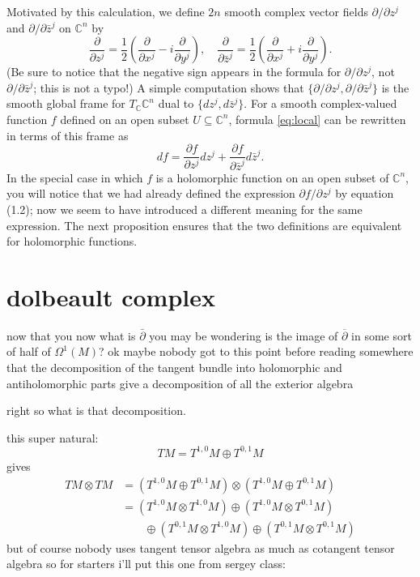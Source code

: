 Motivated by this calculation, we define $2n$ smooth complex vector fields $\partial/\partial z^j$ and $\partial/\partial \bar{z}^j$ on $\mathbb{C}^n$ by
\begin{equation*}
\frac{\partial}{\partial z^j} = \frac{1}{2}\left(\frac{\partial}{\partial x^j} - i\frac{\partial}{\partial y^j}\right), \quad
\frac{\partial}{\partial \bar{z}^j} = \frac{1}{2}\left(\frac{\partial}{\partial x^j} + i\frac{\partial}{\partial y^j}\right).
\end{equation*}
(Be sure to notice that the negative sign appears in the formula for $\partial/\partial z^j$, not $\partial/\partial \bar{z}^j$; this is not a typo!) A simple computation shows that $\{\partial/\partial z^j, \partial/\partial \bar{z}^j\}$ is the smooth global frame for $T_\mathbb{C}\mathbb{C}^n$ dual to $\{dz^j, d\bar{z}^j\}$. For a smooth complex-valued function $f$ defined on an open subset $U \subseteq \mathbb{C}^n$, formula \cref{eq:local} can be rewritten in terms of this frame as
\begin{equation*}
  df = \frac{\partial f}{\partial z^j} dz^j + \frac{\partial f}{\partial \bar{z}^j} d\bar{z}^j.
\end{equation*}
In the special case in which $f$ is a holomorphic function on an open subset of $\mathbb{C}^n$, you will notice that we had already defined the expression $\partial f/\partial z^j$ by equation (1.2); now we seem to have introduced a different meaning for the same expression. The next proposition ensures that the two definitions are equivalent for holomorphic functions.

\section{dolbeault complex}
now that you now what is \(\bar\partial\) you may be wondering is the image of \(\overline{\partial}\) in some sort of half of \(\Omega^1(M)\)? ok maybe nobody got to this point before reading somewhere that the decomposition of the tangent bundle into holomorphic and antiholomorphic parts give a decomposition of all the exterior algebra

right so what is that decomposition.

this super natural:
\[TM=T^{1,0}M \oplus T^{0,1}M\]
gives
\begin{align*}TM \otimes TM&=(T^{1,0}M \oplus T^{0,1}M) \otimes(T^{1,0}M \oplus T^{0,1}M)\\
&=(T^{1,0}M \otimes T^{1,0}M) \oplus (T^{1,0}M\otimes T^{0,1}M)\\&\qquad \oplus (T^{0,1}M \otimes T^{1,0}M) \oplus  (T^{0,1}M \otimes T^{0,1}M)
\end{align*}
but of course nobody uses tangent tensor algebra as much as cotangent tensor algebra so for starters i'll put this one from sergey class:

